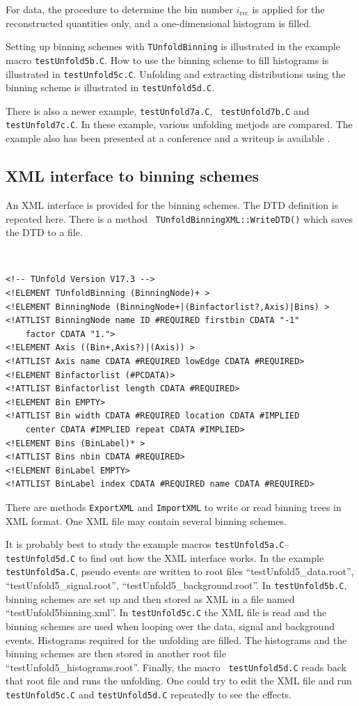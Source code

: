 \documentclass[12pt]{article}
\begin{document}
For data, the procedure to determine the bin number $i_{\text{rec}}$
is applied for the reconstructed quantities only, and a
one-dimensional histogram is filled.

Setting up binning schemes with {\tt TUnfoldBinning} is illustrated in
the example macro {\tt testUnfold5b.C}. How to use the binning scheme to fill
histograms is illustrated in {\tt testUnfold5c.C}.
Unfolding and extracting distributions using the binning scheme is
illustrated in {\tt testUnfold5d.C}.

There is also a newer example, {\tt testUnfold7a.C}, {\tt
  testUnfold7b.C} and {\tt testUnfold7c.C}. In these example, various
unfolding metjods are compared. The example also has been presented at
a conference and a writeup is available \cite{conf12writeup}.

\subsection{XML interface to binning schemes}

An XML interface is provided for the binning schemes. The DTD
definition is repeated here. There is a method {\tt
  TUnfoldBinningXML::WriteDTD()} which saves the DTD to a file.
{\tt
\begin{verbatim}
<!-- TUnfold Version V17.3 -->
<!ELEMENT TUnfoldBinning (BinningNode)+ >
<!ELEMENT BinningNode (BinningNode+|(Binfactorlist?,Axis)|Bins) >
<!ATTLIST BinningNode name ID #REQUIRED firstbin CDATA "-1"
    factor CDATA "1.">
<!ELEMENT Axis ((Bin+,Axis?)|(Axis)) >
<!ATTLIST Axis name CDATA #REQUIRED lowEdge CDATA #REQUIRED>
<!ELEMENT Binfactorlist (#PCDATA)>
<!ATTLIST Binfactorlist length CDATA #REQUIRED>
<!ELEMENT Bin EMPTY>
<!ATTLIST Bin width CDATA #REQUIRED location CDATA #IMPLIED
    center CDATA #IMPLIED repeat CDATA #IMPLIED>
<!ELEMENT Bins (BinLabel)* >
<!ATTLIST Bins nbin CDATA #REQUIRED>
<!ELEMENT BinLabel EMPTY>
<!ATTLIST BinLabel index CDATA #REQUIRED name CDATA #REQUIRED>
\end{verbatim}
}
There are methods {\tt ExportXML} and {\tt ImportXML} to
write or read binning trees in XML format. One XML file may contain
several binning schemes. 

It is probably best to study the example macros {\tt testUnfold5a.C}--{\tt testUnfold5d.C} to find out how the XML interface works. In 
the example {\tt testUnfold5a.C}, pseudo events are written to root
files ``testUnfold5\_data.root'', ``testUnfold5\_signal.root'', ``testUnfold5\_background.root''. In {\tt testUnfold5b.C}, binning schemes are set up and then
stored as XML in a file named ``testUnfold5binning.xml''.
In {\tt testUnfold5c.C} the XML file is read and the binning schemes
are used when looping over the data, signal and background
events. Histograms required for the unfolding are filled. 
The histograms and the binning schemes are then stored in another root
file ``testUnfold5\_histograms.root''. Finally, the macro {\tt
  testUnfold5d.C} reads back that root file and runs the
unfolding. One could try to edit the XML file and run {\tt
  testUnfold5c.C} and {\tt testUnfold5d.C} repeatedly to see the
effects.
\end{document}
